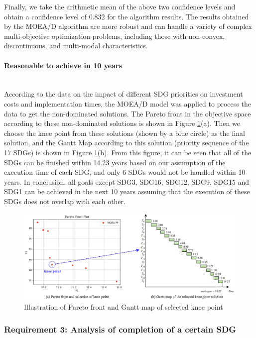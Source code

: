 \documentclass[10pt]{mcmthesis}
\newcommand{\subsubsubsection}[1]{\paragraph{#1}\mbox{}\\}
\begin{document}
Finally, we take the arithmetic mean of the above two confidence levels and obtain a confidence level of 0.832 for the algorithm results. The results obtained by the MOEA/D algorithm are more robust and can handle a variety of complex multi-objective optimization problems, including those with non-convex, discontinuous, and multi-modal characteristics. 



\subsubsubsection{Reasonable to achieve in 10 years}



According to the data on the impact of different SDG priorities on investment costs and implementation times, the MOEA/D model was applied to process the data to get the non-dominated solutions. The Pareto front in the objective space according to these non-dominated solutions is shown in Figure \ref{fig.gantt no over}(a). Then we choose the knee point from these solutions (shown by a blue circle) as the final solution, and the Gantt Map according to this solution (priority sequence of the 17 SDGs) is shown in Figure \ref{fig.gantt no over}(b). From this figure, it can be seen that all of the SDGs can be finished within 14.23 years based on our assumption of the execution time of each SDG, and only 6 SDGs would not be handled within 10 years. In conclusion, all goals except SDG3, SDG16, SDG12, SDG9, SDG15 and SDG1 can be achieved in the next 10 years assuming that the execution of these SDGs does not overlap with each other.

\begin{figure}[h]
    \centering
    \includegraphics[width=16cm]{figures/Illustration.jpg}
    \caption{Illustration of Pareto front and Gantt map of selected knee point  }%
    \label{fig.gantt no over}
    \vspace{-15pt}
\end{figure} 

\subsubsection{Requirement 3: Analysis of completion of a certain SDG}
\end{document}
